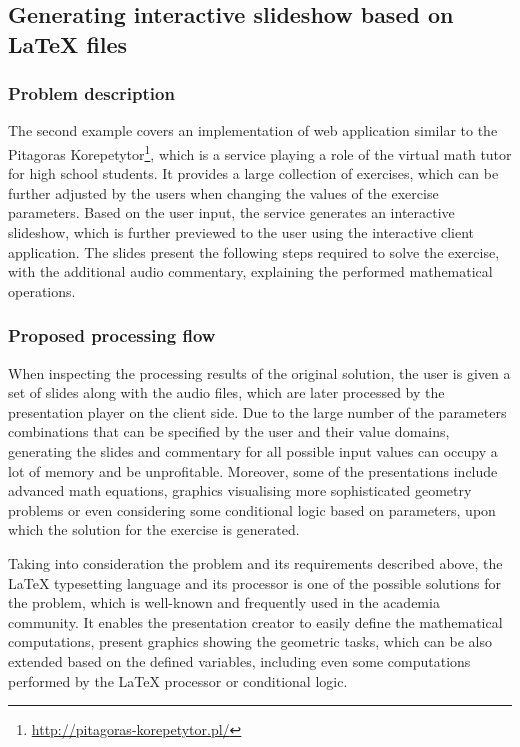 \subsection{Generating interactive slideshow based on LaTeX files} \label{chapter:examples-generating-interactive-slideshow-based-on-latex-files}

\subsubsection{Problem description}

The second example covers an implementation of web application similar to the Pitagoras Korepetytor\footnote{\url{http://pitagoras-korepetytor.pl/}}, which is a service playing a role of the virtual math tutor for high school students.
It provides a large collection of exercises, which can be further adjusted by the users when changing the values of the exercise parameters.
Based on the user input, the service generates an interactive slideshow, which is further previewed to the user using the interactive client application.
The slides present the following steps required to solve the exercise, with the additional audio commentary, explaining the performed mathematical operations.

\subsubsection{Proposed processing flow} \label{chapter:examples-generating-interactive-slideshow-based-on-latex-files-proposed-processing-flow}

When inspecting the processing results of the original solution, the user is given a set of slides along with the audio files, which are later processed by the presentation player on the client side.
Due to the large number of the parameters combinations that can be specified by the user and their value domains, generating the slides and commentary for all possible input values can occupy a lot of memory and be unprofitable.
Moreover, some of the presentations include advanced math equations, graphics visualising more sophisticated geometry problems or even considering some conditional logic based on parameters, upon which the solution for the exercise is generated.

Taking into consideration the problem and its requirements described above, the LaTeX \cite{latex} typesetting language and its processor is one of the possible solutions for the problem, which is well-known and frequently used in the academia community.
It enables the presentation creator to easily define the mathematical computations, present graphics showing the geometric tasks, which can be also extended based on the defined variables, including even some computations performed by the LaTeX processor or conditional logic.

